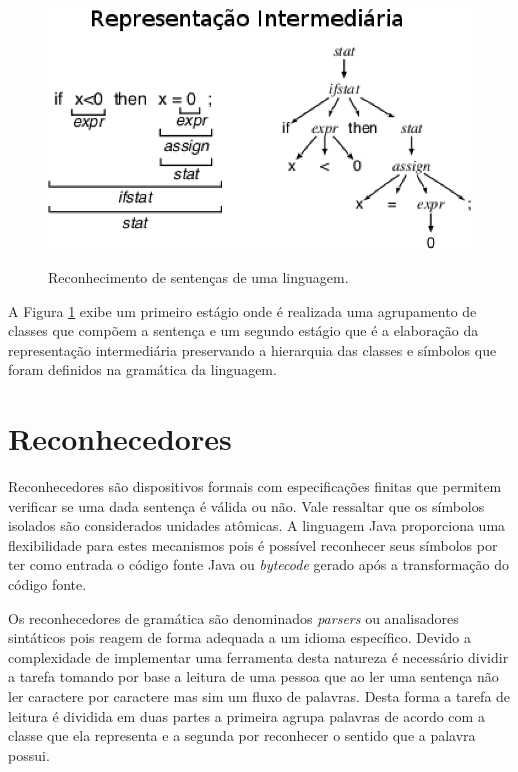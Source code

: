 \begin{figure}[ht]
\centering
\includegraphics[scale=1]{Imagens/rep_intermediaria}
\label{fig:rep_intermediaria}
\caption{Reconhecimento de sentenças de uma linguagem.}
\end{figure}

A Figura \ref{fig:rep_intermediaria} exibe um primeiro estágio onde é realizada uma agrupamento de classes que compõem a sentença e um segundo estágio que é a elaboração da representação intermediária preservando a hierarquia das classes e símbolos que foram definidos na gramática da linguagem.


\section{Reconhecedores}\label{sec:rec}
Reconhecedores são dispositivos formais com especificações finitas que permitem verificar se uma dada sentença é válida ou não. Vale ressaltar que os símbolos isolados são considerados unidades atômicas. A linguagem Java proporciona uma flexibilidade para estes mecanismos pois é possível reconhecer seus símbolos por ter como entrada o código fonte Java ou \textit{bytecode} gerado após a transformação do código fonte.

Os reconhecedores de gramática são denominados \textit{parsers} ou analisadores sintáticos pois reagem de forma adequada a um idioma específico. Devido a complexidade de implementar uma ferramenta desta natureza é necessário dividir a tarefa tomando por base a leitura de uma pessoa que ao ler uma sentença não ler caractere por caractere mas sim um fluxo de palavras. Desta forma a tarefa de leitura é dividida em duas partes a primeira agrupa palavras de acordo com a classe que ela representa e a segunda por reconhecer o sentido que a palavra possui. 

